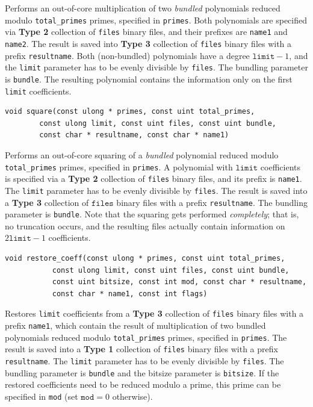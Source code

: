 \documentclass[a4paper,10pt]{article}
\newcommand{\code}{\lstinline}
\begin{document}
Performs an out-of-core multiplication of two \emph{bundled} polynomials reduced modulo \code{total_primes} primes, specified in \code{primes}. Both polynomials are specified via \textbf{Type 2} collection of \code{files} binary files, and their prefixes are \code{name1} and \code{name2}. The result is saved into \textbf{Type 3} collection of \code{files} binary files with a prefix \code{resultname}. Both (non-bundled) polynomials have a degree $\texttt{limit} - 1$, and the \code{limit} parameter has to be evenly divisible by \code{files}. The bundling parameter is \code{bundle}. The resulting polynomial contains the information only on the first \code{limit} coefficients.

\begin{lstlisting}
void square(const ulong * primes, const uint total_primes,
	    const ulong limit, const uint files, const uint bundle,
	    const char * resultname, const char * name1)
\end{lstlisting}

Performs an out-of-core squaring of a \emph{bundled} polynomial reduced modulo \code{total_primes} primes, specified in \code{primes}. A polynomial with $\texttt{limit}$ coefficients is specified via a \textbf{Type 2} collection of \code{files} binary files, and its prefix is \code{name1}. The \code{limit} parameter has to be evenly divisible by \code{files}. The result is saved into a \textbf{Type 3} collection of $\texttt{files}$ binary files with a prefix \code{resultname}. The bundling parameter is \code{bundle}. Note that the squaring gets performed \emph{completely}; that is, no truncation occurs, and the resulting files actually contain information on $2\texttt{limit}-1$ coefficients.

\begin{lstlisting}
void restore_coeff(const ulong * primes, const uint total_primes,
		   const ulong limit, const uint files, const uint bundle,
		   const uint bitsize, const int mod, const char * resultname,
		   const char * name1, const int flags)
\end{lstlisting}

Restores \code{limit} coefficients from a \textbf{Type 3} collection of \code{files} binary files with a prefix \code{name1}, which contain the result of multiplication of two bundled polynomials reduced modulo \code{total_primes} primes, specified in \code{primes}. The result is saved into a \textbf{Type 1} collection of \code{files} binary files with a prefix \code{resultname}. The \code{limit} parameter has to be evenly divisible by \code{files}. The bundling parameter is \code{bundle} and the bitsize parameter is \code{bitsize}. If the restored coefficients need to be reduced modulo a prime, this prime can be specified in \code{mod} (set $\texttt{mod} = 0$ otherwise). %
\end{document}
